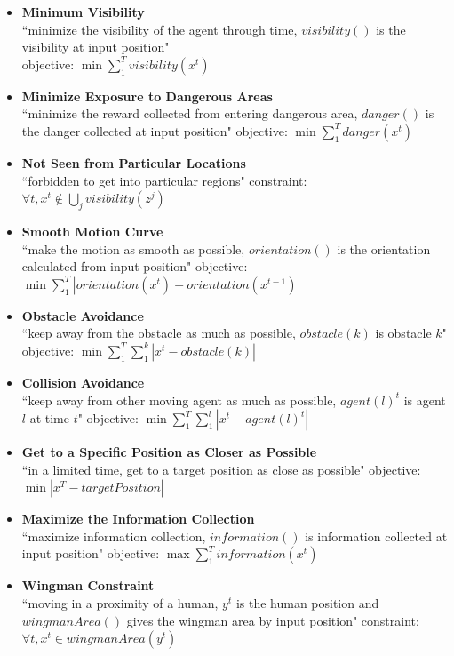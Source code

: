 \documentclass[12pt]{article}
\begin{document}
\begin{itemize}
  \item \textbf{Minimum Visibility} \\
  ``minimize the visibility of the agent through time, $ visibility() $ is the visibility at input position" \\
  objective: $ \min \sum\limits_{1}^{T} visibility(x^{t})  $
  \item \textbf{Minimize Exposure to Dangerous Areas} \\
  ``minimize the reward collected from entering dangerous area, $ danger() $ is the danger collected at input position"
  objective: $ \min \sum\limits_{1}^{T} danger(x^{t}) $
  \item \textbf{Not Seen from Particular Locations} \\
  ``forbidden to get into particular regions"
  constraint: $ \forall t, x^{t} \notin \bigcup_{j} visibility(z^{j}) $
  \item \textbf{Smooth Motion Curve} \\
  ``make the motion as smooth as possible, $ orientation()$ is the orientation calculated from input position"
  objective: $ \min \sum\limits_{1}^{T} \left| orientation(x^{t})-orientation(x^{t-1}) \right| $
  \item \textbf{Obstacle Avoidance} \\
  ``keep away from the obstacle as much as possible, $ obstacle(k) $ is obstacle $ k $"
  objective: $ \min \sum\limits_{1}^{T} \sum\limits_{1}^{k} \left| x^{t} - obstacle(k) \right| $
  \item \textbf{Collision Avoidance} \\
  ``keep away from other moving agent as much as possible, $ agent(l)^{t} $ is agent $ l $ at time $ t $"
  objective: $ \min \sum\limits_{1}^{T} \sum\limits_{1}^{l} \left| x^{t} - agent(l)^{t} \right| $
  \item \textbf{Get to a Specific Position as Closer as Possible} \\
  ``in a limited time, get to a target position as close as possible"
  objective: $ \min \left| x^{T} - targetPosition \right| $
  \item \textbf{Maximize the Information Collection} \\
  ``maximize information collection, $ information() $ is information collected at input position"
  objective: $ \max \sum\limits_{1}^{T}  information(x^{t}) $
  \item \textbf{Wingman Constraint} \\
  ``moving in a proximity of a human, $ y^{t} $ is the human position and $ wingmanArea() $ gives the wingman area by input position"
  constraint: $ \forall t, x^{t} \in wingmanArea(y^{t}) $
\end{itemize}
\end{document}
